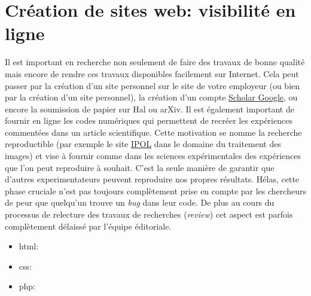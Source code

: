 \section{Création de sites web: visibilité en ligne}
Il est important en recherche non seulement de faire des travaux de bonne qualité
mais encore de rendre ces travaux disponibles facilement sur Internet. Cela peut passer par la création
d'un site personnel sur le site de votre employeur (ou bien par la création d'un site personnel),
la création d'un compte \href{http://scholar.google.com}{Scholar Google}, ou encore la soumission de papier
sur Hal ou arXiv.
Il est également important de fournir en ligne les codes numériques qui permettent de recréer les 
expériences commentées dans un article scientifique. Cette motivation se nomme 
la recherche reproductible (\lcf par exemple le site \href{http://www.ipol.im/}{IPOL} dans le domaine
du traitement des images)  et vise à fournir comme dans les sciences expérimentales des expériences 
que l'on peut reproduire à souhait. C'est la seule manière de garantir que d'autres experimentateurs
peuvent reproduire nos propres résultats. Hélas, cette phase cruciale n'est pas toujours complètement 
prise en compte par les chercheurs de peur que quelqu'un trouve un \textit{bug} dans leur code.
De plus au cours du processus de relecture des travaux de recherches (\textit{review}) cet
aspect est parfois complètement délaissé par l'équipe éditoriale.

\begin{itemize}
 \item  html:
 \item  css:
 \item  php:
\end{itemize}


